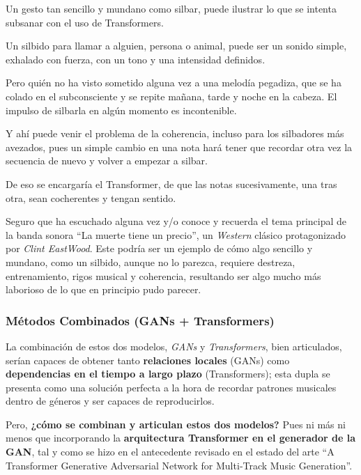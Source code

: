 \begin{tcolorbox}[title=Silbar es cosa de niños,colback=gray!10, colframe=gray!50, sharp corners=south]

Un gesto tan sencillo y mundano como silbar, puede ilustrar lo que se intenta subsanar con el uso de Transformers.

Un silbido para llamar a alguien, persona o animal, puede ser un sonido simple, exhalado con fuerza, con un tono y una intensidad definidos.

Pero quién no ha visto sometido alguna vez a una melodía pegadiza, que se ha colado en el subconsciente y se repite mañana, tarde y noche en la cabeza. El impulso de silbarla en algún momento es incontenible.

Y ahí puede venir el problema de la coherencia, incluso para los silbadores más avezados, pues un simple cambio en una nota hará tener que recordar otra vez la secuencia de nuevo y volver a empezar a silbar.

De eso se encargaría el Transformer, de que las notas sucesivamente, una tras otra, sean cocherentes y tengan sentido.

Seguro que ha escuchado alguna vez y/o conoce y recuerda el tema principal de la banda sonora ``La muerte tiene un precio'', un \emph{Western} clásico protagonizado por \emph{Clint EastWood}. Este podría ser un ejemplo de cómo algo sencillo y mundano, como un silbido, aunque no lo parezca, requiere destreza, entrenamiento, rigos musical y coherencia, resultando ser algo mucho más laborioso de lo que en principio pudo parecer.

\end{tcolorbox}

\subsubsection{Métodos Combinados (GANs + Transformers)}

La combinación de estos dos modelos, \textit{GANs} y \textit{Transformers}, bien articulados, serían capaces de obtener tanto \textbf{relaciones locales} (GANs) como \textbf{dependencias en el tiempo a largo plazo} (Transformers); esta dupla se presenta como una solución perfecta a la hora de recordar patrones musicales dentro de géneros y ser capaces de reproducirlos.

Pero, \textbf{¿cómo se combinan y articulan estos dos modelos?} Pues ni más ni menos que incorporando la \textbf{arquitectura Transformer en el generador de la GAN}, tal y como se hizo en el antecedente revisado en el estado del arte ``A Transformer Generative Adversarial Network for Multi‐Track Music Generation''\citep{jin2022transformer}.

